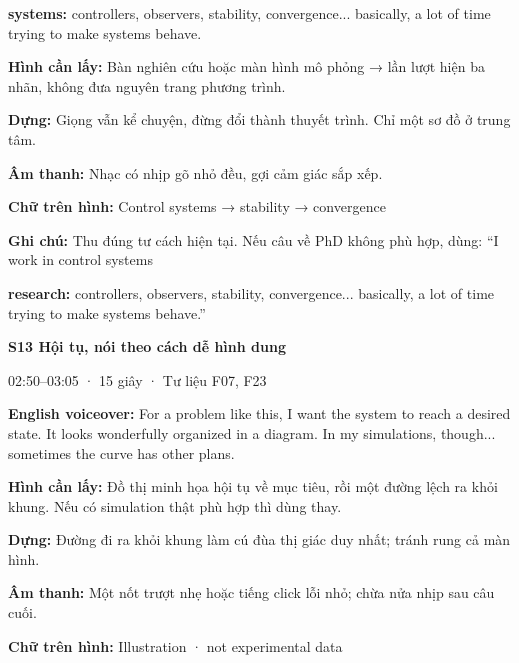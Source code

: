 \documentclass[10pt,a4paper]{article}
\begin{document}
\textbf{systems:}  controllers, observers, stability, convergence... basically, a lot of time trying to make systems behave.\par

\textbf{Hình cần lấy:}  Bàn nghiên cứu hoặc màn hình mô phỏng → lần lượt hiện ba nhãn, không đưa nguyên trang phương trình.\par

\textbf{Dựng:}  Giọng vẫn kể chuyện, đừng đổi thành thuyết trình. Chỉ một sơ đồ ở trung tâm.\par

\textbf{Âm thanh:}  Nhạc có nhịp gõ nhỏ đều, gợi cảm giác sắp xếp.\par

\textbf{Chữ trên hình:}  Control systems → stability → convergence\par

\textbf{Ghi chú:}  Thu đúng tư cách hiện tại. Nếu câu về PhD không phù hợp, dùng: “I work in control systems\par

\textbf{research:}  controllers, observers, stability, convergence... basically, a lot of time trying to make systems behave.”\par

\textbf{S13 Hội tụ, nói theo cách dễ hình dung}\par

02:50–03:05 · 15 giây · Tư liệu F07, F23\par

\textbf{English voiceover:}  For a problem like this, I want the system to reach a desired state. It looks wonderfully organized in a diagram. In my simulations, though... sometimes the curve has other plans.\par

\textbf{Hình cần lấy:}  Đồ thị minh họa hội tụ về mục tiêu, rồi một đường lệch ra khỏi khung. Nếu có simulation thật phù hợp thì dùng thay.\par

\textbf{Dựng:}  Đường đi ra khỏi khung làm cú đùa thị giác duy nhất; tránh rung cả màn hình.\par

\textbf{Âm thanh:}  Một nốt trượt nhẹ hoặc tiếng click lỗi nhỏ; chừa nửa nhịp sau câu cuối.\par

\textbf{Chữ trên hình:}  Illustration · not experimental data\par
\end{document}
